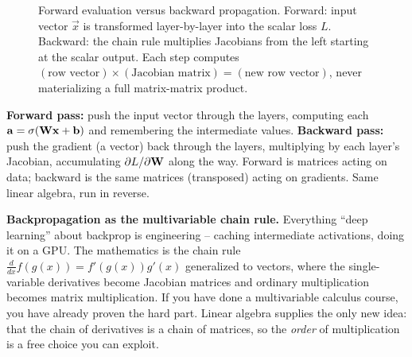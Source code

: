 \begin{figure}[htbp]
\caption{Forward evaluation versus backward propagation. Forward: input vector $\vec{x}$ is transformed layer-by-layer into the scalar loss $L$. Backward: the chain rule multiplies Jacobians from the left starting at the scalar output. Each step computes $(\text{row vector})\times(\text{Jacobian matrix}) = (\text{new row vector})$, never materializing a full matrix-matrix product.}
\label{ch34:fig-backprop}
\end{figure}

\begin{focusbox}
\textbf{Forward pass:} push the input vector through the layers, computing each
$\mathbf{a}=\sigma(\mathbf{W}\mathbf{x}+\mathbf{b})$ and remembering the intermediate values.
\textbf{Backward pass:} push the gradient (a vector) back through the layers, multiplying
by each layer's Jacobian, accumulating $\partial L/\partial \mathbf{W}$ along the way.
Forward is matrices acting on data; backward is the same matrices (transposed) acting on
gradients. Same linear algebra, run in reverse.
\end{focusbox}

\begin{connectionbox}
\textbf{Backpropagation as the multivariable chain rule.} Everything ``deep learning''
about backprop is engineering -- caching intermediate activations, doing it on a GPU. The
mathematics is the chain rule $\frac{d}{dx}f(g(x))=f'(g(x))g'(x)$ generalized to vectors,
where the single-variable derivatives become Jacobian matrices and ordinary
multiplication becomes matrix multiplication. If you have done a multivariable calculus
course, you have already proven the hard part. Linear algebra supplies the only new idea:
that the chain of derivatives is a chain of matrices, so the \emph{order} of multiplication
is a free choice you can exploit.
\end{connectionbox}


